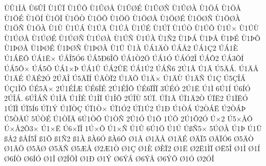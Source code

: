 {^^d9^^db1^^cc^^c5
^^d96^^db^^ce
^^d91^^db^^cf
^^d91^^db^^d5
^^d91^^db^^d8^^c5
^^d91^^db^^d8^^c9
^^d91^^db^^d8^^d1
^^d91^^db^^d8^^c0
^^d91^^d6^^c1
^^d91^^d6^^c5
^^d91^^d6^^c9
^^d91^^d6^^cd
^^d91^^d6^^cf
^^d91^^d6^^d2
^^d91^^d6^^d5
^^d91^^d6^^d6
^^d91^^d6^^d8^^c5
^^d91^^d6^^d8^^c9
^^d91^^d6^^d8^^d1
^^d91^^d6^^d8^^c0
^^d91^^d6^^d1
^^d91^^d6^^c0
^^d91^^d9
^^d91^^da^^c1
^^d91^^da^^c4
^^d91^^da^^c5
^^d91^^da^^c9
^^d91^^da^^cf
^^d91^^da^^d2
^^d91^^da^^d5
^^d91^^da^^d7
^^d91^^da^^d9
^^d91^^da^^d8^^c5
^^d91^^da^^d8^^c9
^^d91^^da^^d8^^d1
^^d91^^da^^d8^^c0
^^d91^^da^^d1
^^d91^^da^^c0
^^d91^^d12
^^d91^^de^^c1
^^d91^^de^^c5
^^d91^^de^^c9
^^d91^^de^^d5
^^d91^^de^^d8^^c5
^^d91^^de^^d8^^c9
^^d91^^de^^d8^^d1
^^d91^^de^^d8^^c0
^^d91^^dc
^^d91^^c0
^^da^^c11^^c4^^d2
^^da^^c1^^c52
^^da^^c11^^c72
^^da^^c11^^c8
^^da1^^c1^^cb^^d4
^^da^^c11^^cb^^d7
^^da^^c1^^ce5^^d36
^^da^^c15^^d06^^ce^^d5
^^da^^c11^^d22^^d6
^^da^^c11^^d3
^^da^^c1^^d32^^ce
^^da^^c1^^d42
^^da^^c13^^d4^^cd
^^da^^c15^^d4^^d7
^^da^^c15^^d5
^^da^^c11^^d7^^de
^^da^^c11^^db
^^da^^c12^^db^^cb
^^da^^c11^^da2
^^da^^c1^^d16
2^^da1^^c2
^^da1^^c3
^^da5^^c4^^c1.
^^da1^^c4^^c5
^^da1^^c4^^c9
^^da^^c4^^c92^^d3
2^^da^^c4^^ce
^^da5^^c4^^cf^^cd
^^da^^c4^^d2^^cf2
^^da1^^c4^^d5
^^da1^^c4^^d7
^^da1^^c4^^d9
^^da1^^c4^^d1
^^da1^^c7
^^da5^^c7^^ce^^c1
^^da^^c71^^ce^^d5
^^da^^c95^^c4^^d7
2^^da1^^c9^^ce^^c6
^^da^^c96^^ce^^c9
2^^da1^^c9^^ce^^d4
^^da^^c96^^cf^^ce^^cf
3^^da^^c9^^d3
2^^da1^^cb
^^da1^^cc
6^^da1^^cd
^^da6^^cd^^d3
2^^da^^ce^^c1.
6^^da^^ce^^c1^^d1
^^da1^^ce^^c5
^^da1^^ce^^c9
^^da1^^ce^^cf
^^da1^^ce^^d5
2^^da^^ce^^d9
5^^da^^cf.
^^da^^cf1^^c2
^^da^^cf1^^c42^^d2
^^da^^cf^^cb2
^^da1^^cf^^cb^^d3
1^^da^^cf^^cc
^^da^^cf5^^cd6
^^da^^cf1^^dd
^^da1^^cf^^d2^^c7
^^da^^cf1^^d2^^d7
^^da^^cf1^^d32
^^da^^cf1^^da2
^^da1^^d0
^^da1^^d2^^c1
^^da2^^d2^^c1^^cb
^^da2^^d2^^c1^^de
^^da5^^d2^^c5^^da
5^^da^^d2^^c9
^^da1^^d2^^cf^^c4
6^^da1^^d2^^d5
^^da1^^d2^^d1
2^^da1^^d3
^^da1^^d4
1^^da^^d5
2^^da1^^d52^^d3
^^da^^d72
^^da5^^d7^^c5^^d4
^^da^^d7^^c52^^d43^^d7
^^da1^^d7^^cb
^^da6^^d7^^cf^^ce
1^^da^^d7^^d5
^^da1^^d7^^d1
^^da1^^db
6^^da1^^d6
^^da1^^da
^^da^^df^^d15^^d7
5^^da^^d8^^c0
^^da1^^de
^^da1^^dc
^^df^^c52
^^df^^c5^^cd5^^ce
^^df1^^d5
^^df1^^d12
^^df1^^c0
^^df^^c06^^d3
^^df^^c06^^d4
^^d81^^c2
^^d81^^c4^^c5
^^d81^^c4^^c9
^^d8^^c4^^cf5
^^d8^^c4^^cf^^d36
^^d85^^c4^^d2
^^d81^^c4^^d6
^^d85^^c4^^d8
^^d85^^c4^^d1
^^d85^^c6^^c5
^^d82^^c61^^d2
^^d81^^c7
^^d81^^c8
^^d8^^c8^^cf2
^^d81^^cb
^^d82^^cb1^^cc^^cf
^^d8^^cb5^^ce
^^d81^^cc
^^d81^^cd
^^d86^^cd^^d2
^^d86^^cd^^d3
^^d81^^ce
^^d82^^ce^^d5^^cc
^^d81^^d0
^^d81^^dd
^^d86^^dd^^c1
^^d86^^dd^^c5
^^d86^^dd^^d5
^^d81^^d3
^^d82^^d3^^ce
}
